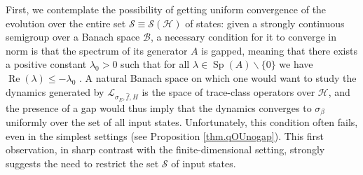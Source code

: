 \documentclass[11pt]{amsart}
\newcommand{\1}{\mathbbm{1}}
\theoremstyle{plain}
\theoremstyle{definition}
\theoremstyle{remark}
\numberwithin{equation}{section}
\begin{document}
\smallskip
First, we contemplate the possibility of getting uniform convergence of the evolution over the entire set $\mathscr{S}\equiv \mathscr{S}(\mathcal{H})$ of states: given a strongly continuous semigroup over a Banach space $\mathscr{B}$, a necessary condition for it to converge in norm is that the spectrum of its generator $A$ is gapped, meaning that there exists a positive constant $\lambda_0>0$ such that for all $\lambda\in\operatorname{Sp}(A)\backslash \{0\}$ we have $\operatorname{Re}(\lambda)\le -\lambda_0$ \cite[Corollary 4.1.2]{salzmann2024robustness}.
 A natural Banach space on which one would want to study the dynamics generated by $\mathcal{L}_{\sigma_E,\widehat{f},H}$ is the space of trace-class operators over $\mathcal{H}$, and the presence of a gap would thus imply that the dynamics converges to $\sigma_\beta$ uniformly over the set of all input states. Unfortunately, this condition often fails, even in the simplest settings (see Proposition \ref{thm.qOUnogap}). This first observation, in sharp contrast with the finite-dimensional setting, strongly suggests the need to restrict the set $\mathscr{S}$ of input states.

\smallskip
\end{document}
